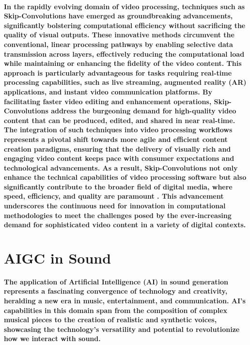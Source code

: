 \documentclass[11pt,a4paper,oneside]{report}
\begin{document}
\paragraph{In the rapidly evolving domain of video processing, techniques such as Skip-Convolutions have emerged as groundbreaking advancements, significantly bolstering computational efficiency without sacrificing the quality of visual outputs. These innovative methods circumvent the conventional, linear processing pathways by enabling selective data transmission across layers, effectively reducing the computational load while maintaining or enhancing the fidelity of the video content. This approach is particularly advantageous for tasks requiring real-time processing capabilities, such as live streaming, augmented reality (AR) applications, and instant video communication platforms. By facilitating faster video editing and enhancement operations, Skip-Convolutions address the burgeoning demand for high-quality video content that can be produced, edited, and shared in near real-time. The integration of such techniques into video processing workflows represents a pivotal shift towards more agile and efficient content creation paradigms, ensuring that the delivery of visually rich and engaging video content keeps pace with consumer expectations and technological advancements. As a result, Skip-Convolutions not only enhance the technical capabilities of video processing software but also significantly contribute to the broader field of digital media, where speed, efficiency, and quality are paramount \cite{habibian2021skip}. This advancement underscores the continuous need for innovation in computational methodologies to meet the challenges posed by the ever-increasing demand for sophisticated video content in a variety of digital contexts.}

\section{AIGC in Sound}
\paragraph{The application of Artificial Intelligence (AI) in sound generation represents a fascinating convergence of technology and creativity, heralding a new era in music, entertainment, and communication. AI's capabilities in this domain span from the composition of complex musical pieces to the creation of realistic and synthetic voices, showcasing the technology's versatility and potential to revolutionize how we interact with sound.}
\end{document}
